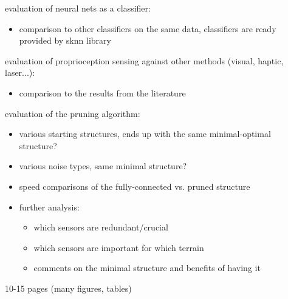 evaluation of neural nets as a classifier:
\begin{itemize}
\item comparison to other classifiers on the same data, classifiers are ready provided by sknn library
\end{itemize}

evaluation of proprioception sensing against other methods (visual, haptic, laser...):
\begin{itemize}
\item comparison to the results from the literature
\end{itemize}

evaluation of the pruning algorithm:
\begin{itemize}
\item various starting structures, ends up with the same minimal-optimal structure?
\item various noise types, same minimal structure?
\item speed comparisons of the fully-connected vs. pruned structure
\item further analysis:
 \begin{itemize}
 \item which sensors are redundant/crucial
 \item which sensors are important for which terrain
 \item comments on the minimal structure and benefits of having it
 \end{itemize}
\end{itemize}
10-15 pages (many figures, tables)
